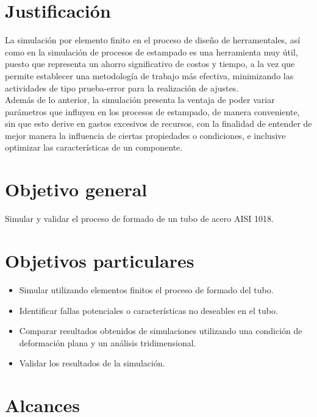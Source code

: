 \section{Justificación}

La simulación por elemento finito en el proceso de diseño de herramentales, así como en 
la simulación de procesos de estampado es una herramienta muy útil, puesto que representa un ahorro 
significativo de costos y tiempo, a la vez que permite establecer una metodología de trabajo más efectiva, minimizando las 
actividades de tipo prueba-error para la realización de ajustes.\\

Además de lo anterior, la simulación presenta la ventaja de poder variar parámetros que influyen en los procesos de 
estampado, de manera conveniente, sin que esto derive en gastos excesivos de recursos, con la finalidad de entender 
de mejor manera la influencia de ciertas propiedades o condiciones, e inclusive optimizar las características 
de un componente.

\section{Objetivo general}

Simular y validar el proceso de formado de un tubo de acero AISI 1018.

\section{Objetivos particulares}
\begin{itemize}
\item Simular utilizando elementos finitos el proceso de formado del tubo.
\item Identificar fallas potenciales o características no deseables en el tubo.
\item Comparar resultados obtenidos de simulaciones utilizando una condición de deformación plana y un análisis tridimensional.
\item Validar los resultados de la simulación.
\end{itemize}


\section{Alcances}

